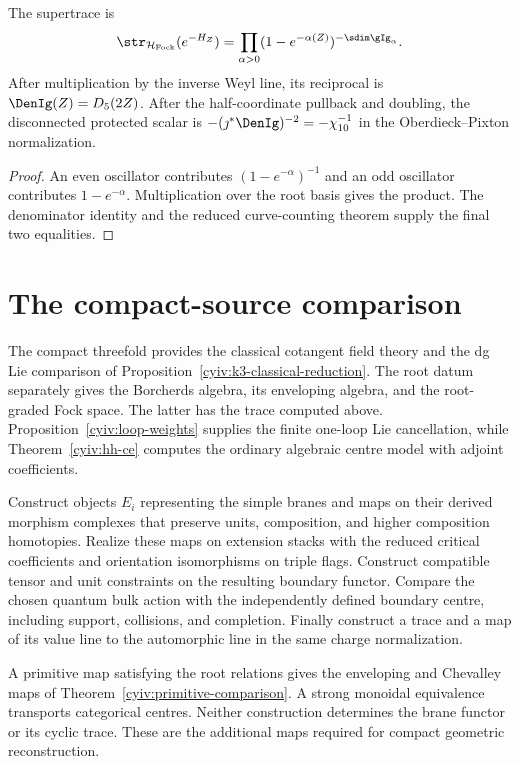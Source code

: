 \begin{theorem}
The supertrace is
\[
 \str_{\mathcal H_{\mathrm{Fock}}}(e^{-H_Z})
 =\prod_{\alpha>0}
 (1-e^{-\alpha(Z)})^{-\sdim\gIg_\alpha}.
\]
After multiplication by the inverse Weyl line, its reciprocal is $\DenIg(Z)=D_5(2Z)$.  After the half-coordinate pullback and doubling, the disconnected protected scalar is $-(\jmath^*\DenIg)^{-2}=-\chi_{10}^{-1}$ in the Oberdieck--Pixton normalization.
\end{theorem}
\begin{proof}
An even oscillator contributes $(1-e^{-\alpha})^{-1}$ and an odd oscillator contributes $1-e^{-\alpha}$.  Multiplication over the root basis gives the product.  The denominator identity and the reduced curve-counting theorem supply the final two equalities.
\end{proof}

\chapter{The compact-source comparison}
The compact threefold provides the classical cotangent field theory
and the dg Lie comparison of Proposition~\ref{cyiv:k3-classical-reduction}.
The root datum separately gives the Borcherds algebra, its enveloping
algebra, and the root-graded Fock space.
The latter has the trace computed above.
Proposition~\ref{cyiv:loop-weights} supplies the finite one-loop Lie
cancellation, while Theorem~\ref{cyiv:hh-ce} computes the ordinary
algebraic centre model with adjoint coefficients.

\begin{problem}\label{cyiv:compact-comparison}
Construct objects $E_i$ representing the simple branes and maps on their
derived morphism complexes that preserve units, composition, and higher
composition homotopies.
Realize these maps on extension stacks with the reduced critical
coefficients and orientation isomorphisms on triple flags.
Construct compatible tensor and unit constraints on the resulting
boundary functor.
Compare the chosen quantum bulk action with the independently defined
boundary centre, including support, collisions, and completion.
Finally construct a trace and a map of its value line to the automorphic
line in the same charge normalization.
\end{problem}

A primitive map satisfying the root relations gives the enveloping and
Chevalley maps of Theorem~\ref{cyiv:primitive-comparison}.
A strong monoidal equivalence transports categorical centres.
Neither construction determines the brane functor or its cyclic trace.
These are the additional maps required for compact geometric
reconstruction.

